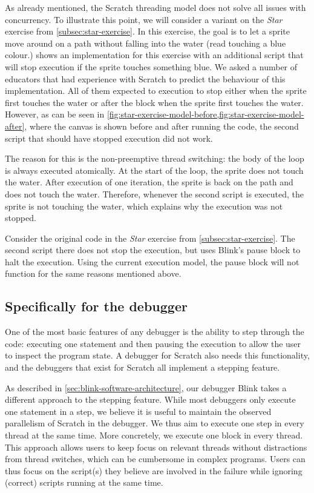 \documentclass[../main]{subfiles}
\begin{document}
As \citeauthor{maloneyScratchProgrammingLanguage2010a} already mentioned, the Scratch threading model does not solve all issues with concurrency.
To illustrate this point, we will consider a variant on the \emph{Star} exercise from \cref{subsec:star-exercise}.
In this exercise, the goal is to let a sprite move around on a path without falling into the water (read touching a blue colour.)
 shows an implementation for this exercise with an additional script that will stop execution if the sprite touches something blue.
We asked a number of educators that had experience with Scratch to predict the behaviour of this implementation.
All of them expected to execution to stop either when the sprite first touches the water or after the block when the sprite first touches the water.
However, as can be seen in \cref{fig:star-exercise-model-before,fig:star-exercise-model-after}, where the canvas is shown before and after running the code, the second script that should have stopped execution did not work.

The reason for this is the non-preemptive thread switching: the body of the loop is always executed atomically.
At the start of the loop, the sprite does not touch the water.
After execution of one iteration, the sprite is back on the path and does not touch the water.
Therefore, whenever the second script is executed, the sprite is not touching the water, which explains why the execution was not stopped.

Consider the original code in the \emph{Star} exercise from \cref{subsec:star-exercise}.
The second script there does not stop the execution, but uses Blink's pause block to halt the execution.
Using the current execution model, the pause block will not function for the same reasons mentioned above.

\subsection{Specifically for the debugger}\label{subsec:specifically-for-the-debugger}

One of the most basic features of any debugger is the ability to step through the code: executing one statement and then pausing the execution to allow the user to inspect the program state.
A debugger for Scratch also needs this functionality, and the debuggers that exist for Scratch all implement a stepping feature.

As described in \cref{sec:blink-software-architecture}, our debugger Blink takes a different approach to the stepping feature.
While most debuggers only execute one statement in a step, we believe it is useful to maintain the observed parallelism of Scratch in the debugger.
We thus aim to execute one step in every thread at the same time.
More concretely, we execute one block in every thread.
This approach allows users to keep focus on relevant threads without distractions from thread switches, which can be cumbersome in complex programs.
Users can thus focus on the script(s) they believe are involved in the failure while ignoring (correct) scripts running at the same time.
\end{document}
